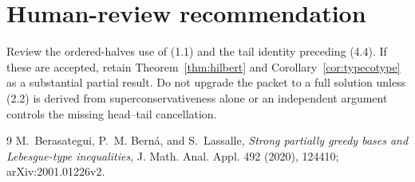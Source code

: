 \documentclass[11pt]{article}
\begin{document}
\section{Human-review recommendation}

Review the ordered-halves use of (1.1) and the tail identity preceding
(4.4).  If these are accepted, retain Theorem~\ref{thm:hilbert} and
Corollary~\ref{cor:typecotype} as a substantial partial result.  Do not
upgrade the packet to a full solution unless (2.2) is derived from
superconservativeness alone or an independent argument controls the missing
head--tail cancellation.

\begin{thebibliography}{9}
M.~Berasategui, P.~M. Bern\'a, and S.~Lassalle,
\emph{Strong partially greedy bases and Lebesgue-type inequalities},
J. Math. Anal. Appl. 492 (2020), 124410; arXiv:2001.01226v2.
\end{thebibliography}
\end{document}
